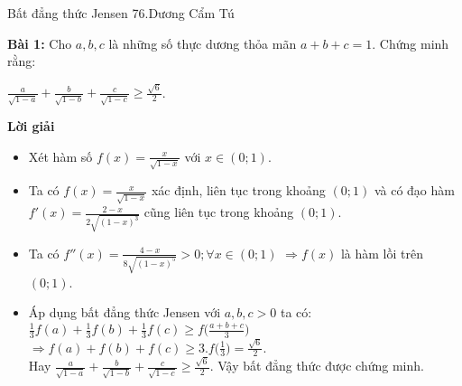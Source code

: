 \begin{frame}{{Bất đẳng thức Jensen} \hspace{6.5cm} 76.Dương Cẩm Tú} 


\textbf{Bài 1:} Cho $a,b,c$ là những số thực dương thỏa mãn $a+b+c=1$. Chứng minh rằng:\\
\begin{center}
      $\displaystyle\frac{a}{\sqrt{1-a}}+\frac{b}{\sqrt{1-b}}+\frac{c}{\sqrt{1-c}}\geq \frac{\sqrt{6}}{2}$.\\
    \pause
    \end{center}

    \textbf{Lời giải}
\begin{itemize}
 \item Xét hàm số $f(x)=\frac{x}{\sqrt{1-x}}$ với $x\in(0;1)$.\\
\pause
 \item Ta có $f(x)=\displaystyle\frac{x}{\sqrt{1-x}}$ xác định, liên tục trong khoảng $(0;1)$ và có đạo hàm $f'(x)=\displaystyle\frac{2-x}{2\sqrt{(1-x)^3}}$ cũng liên tục trong khoảng $(0;1)$.\\
\pause
\vspace{0,25cm}
 \item Ta có $f''(x)=\displaystyle\frac{4-x}{8\sqrt{(1-x)^5}}>0; \forall x\in (0;1)$
$\Rightarrow f(x)$ là hàm lồi trên $(0;1)$.\\
\pause
 \item Áp dụng bất đẳng thức Jensen với $a,b,c>0$ ta có:\\
$\frac{1}{3}f(a)+\frac{1}{3}f(b)+\frac{1}{3}f(c)\geq f\Big(\frac{a+b+c}{3}\Big)$
$\Rightarrow f(a)+f(b)+f(c)\geq 3.f\Big(\frac{1}{3}\Big)=\frac{\sqrt{6}}{2}.$\\
\pause
Hay $\displaystyle\frac{a}{\sqrt{1-a}}+\frac{b}{\sqrt{1-b}}+\frac{c}{\sqrt{1-c}}\geq \frac{\sqrt{6}}{2}$.
Vậy bất đẳng thức được chứng minh.
\end{itemize}
\end{frame}
